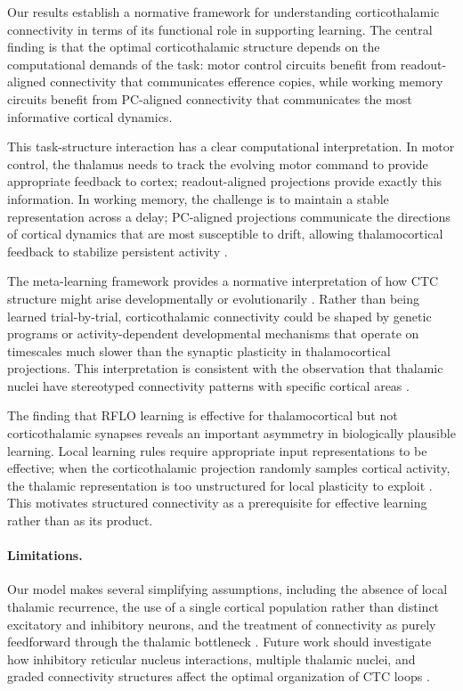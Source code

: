 \documentclass[11pt]{article}
\begin{document}
Our results establish a normative framework for understanding corticothalamic connectivity in terms of its functional role in supporting learning. The central finding is that the optimal corticothalamic structure depends on the computational demands of the task: motor control circuits benefit from readout-aligned connectivity that communicates efference copies, while working memory circuits benefit from PC-aligned connectivity that communicates the most informative cortical dynamics.

This task-structure interaction has a clear computational interpretation. In motor control, the thalamus needs to track the evolving motor command to provide appropriate feedback to cortex; readout-aligned projections provide exactly this information. In working memory, the challenge is to maintain a stable representation across a delay; PC-aligned projections communicate the directions of cortical dynamics that are most susceptible to drift, allowing thalamocortical feedback to stabilize persistent activity \citep{guo2017maintenance, logiaco2021thalamus}.

The meta-learning framework provides a normative interpretation of how CTC structure might arise developmentally or evolutionarily \citep{finn2021learning}. Rather than being learned trial-by-trial, corticothalamic connectivity could be shaped by genetic programs or activity-dependent developmental mechanisms that operate on timescales much slower than the synaptic plasticity in thalamocortical projections. This interpretation is consistent with the observation that thalamic nuclei have stereotyped connectivity patterns with specific cortical areas \citep{sherman2001thalamus, halassa2017thalamic}.

The finding that RFLO learning is effective for thalamocortical but not corticothalamic synapses reveals an important asymmetry in biologically plausible learning. Local learning rules require appropriate input representations to be effective; when the corticothalamic projection randomly samples cortical activity, the thalamic representation is too unstructured for local plasticity to exploit \citep{lillicrap2016rflo}. This motivates structured connectivity as a prerequisite for effective learning rather than as its product.

\paragraph{Limitations.} Our model makes several simplifying assumptions, including the absence of local thalamic recurrence, the use of a single cortical population rather than distinct excitatory and inhibitory neurons, and the treatment of connectivity as purely feedforward through the thalamic bottleneck \citep{mastrogiuseppe2018linking}. Future work should investigate how inhibitory reticular nucleus interactions, multiple thalamic nuclei, and graded connectivity structures affect the optimal organization of CTC loops \citep{schmitt2017thalamic}.
\end{document}
